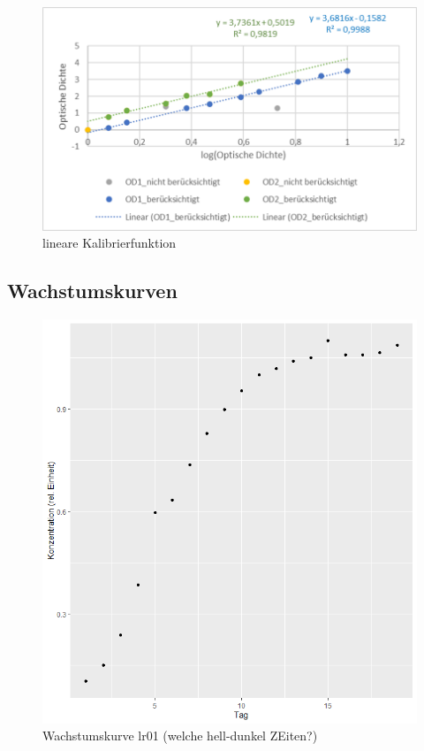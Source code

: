 \documentclass[
]{article}
\begin{document}
\begin{figure}
\centering
\includegraphics{Kalibrierfunktion.png}
\caption{lineare Kalibrierfunktion}
\end{figure}

\hypertarget{wachstumskurven}{%
\subsection{Wachstumskurven}\label{wachstumskurven}}

\begin{figure}
\centering
\includegraphics{Wachstumskurve_Versuch02_lr01.png}
\caption{Wachstumskurve lr01 (welche hell-dunkel ZEiten?)}
\end{figure}
\end{document}
